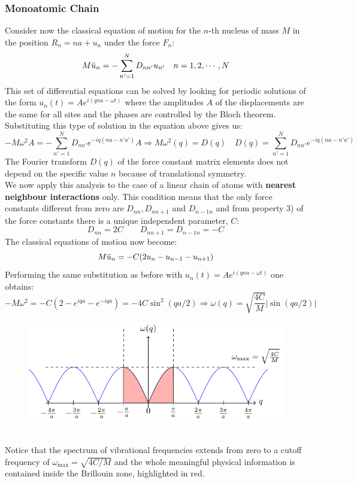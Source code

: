 \documentclass[10.75pt,a4paper,openright,bottom=2cm]{article}
\begin{document}
\subsubsection{Monoatomic Chain}
Consider now the classical equation of motion for the $n$-th nucleus of mass $M$ in the position $R_n=na+u_n$ under the force $F_n$:
\[
M\Ddot{u}_n=-\sum_{n'=1}^ND_{nn'}u_{n'} \quad n=1,2,\cdots,N
\]
This set of differential equations can be solved by looking for periodic solutions of the form $u_n(t)=Ae^{i(qna-\omega t)}$ where the amplitudes $A$ of the displacements are the same for all sites and the phases are controlled by the Bloch theorem. Substituting this type of solution in the equation above gives us:
\[
-M\omega^2A=-\sum_{n'=1}^ND_{nn'}e^{-iq(na-n'a')}A\Rightarrow M\omega^2(q)=D(q) \quad D(q)=\sum_{n'=1}^ND_{nn'}e^{-iq(na-n'a')}
\]
The Fourier transform $D(q)$ of the force constant matrix elements does not depend on the specific value $n$ because of translational symmetry.\\
We now apply this analysis to the case of a linear chain of atoms with \textbf{nearest neighbour interactions} only. This condition means that the only force constants different from zero are $D_{nn}, D_{nn+1}$ and $D_{n-1n}$ and from property 3) of the force constants there is a unique independent parameter, $C$:
\[
D_{nn}=2C \qquad D_{nn+1}=D_{n-1n}=-C
\]
The classical equations of motion now become:
\[
M\Ddot{u}_n=-C(2u_n-u_{n-1}-u_{n+1})
\]
Performing the same substitution as before with $u_n(t)=Ae^{i(qna-\omega t)}$ one obtains:
\[
-M\omega^2=-C(2-e^{iqa}-e^{-iqa})=-4C\sin^2(qa/2)\Rightarrow\omega(q)=\sqrt{\frac{4C}{M}}|\sin(qa/2)|
\]
\begin{figure}[h]
    \centering
    \includegraphics{omega(q).pdf}
    \label{fig:omega(q)}
\end{figure}\\
\noindent 
Notice that the spectrum of vibrational frequencies extends from zero to a cutoff frequency of $\omega_{\max}=\sqrt{4C/M}$ and the whole meaningful physical information is contained inside the  Brillouin zone, highlighted in red.\\
\end{document}
